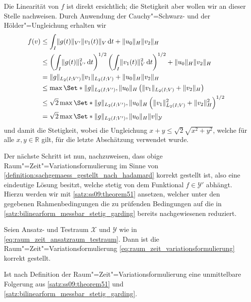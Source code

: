 \documentclass[../main.tex]{subfiles}
\begin{document}
\begin{Bemerkung}
\label{bemerkung:raum_zeit_variationsformulierung_rhs_stetig}
    Die Linearität von $f$ ist direkt ersichtlich; die Stetigkeit aber wollen wir an dieser Stelle nachweisen.
    Durch Anwendung der Cauchy"=Schwarz- und der Hölder"=Ungleichung erhalten wir
    \begin{equation}
        \begin{aligned}
            f(v)
            &\leq \int_{I} \norm{g(t)}_{V'} \norm{v_{1}(t)}_{V} \diff t + \norm{u_{0}}_{H} \norm{v_{2}}_{H}
            \\&\leq \left( \int_{I} \norm{g(t)}^{2}_{V'} \diff t \right)^{1/2} \left( \int_{I} \norm{v_{1}(t)}^{2}_{V} \diff t \right)^{1/2} + \norm{u_{0}}_{H} \norm{v_{2}}_{H}
            \\&= \norm{g}_{L_{2}(I; V')} \norm{v_{1}}_{L_{2}(I; V)} + \norm{u_{0}}_{H} \norm{v_{2}}_{H}
            \\&\leq \max\Set*{\norm{g}_{L_{2}(I; V')}, \norm{u_{0}}_{H}} \left( \norm{v_{1}}_{L_{2}(I; V)} + \norm{v_{2}}_{H} \right)
            \\&\leq \sqrt{2} \max\Set*{\norm{g}_{L_{2}(I; V')}, \norm{u_{0}}_{H}} \left( \norm{v_{1}}_{L_{2}(I; V)}^{2} + \norm{v_{2}}_{H}^{2} \right)^{1/2}
            \\&= \sqrt{2} \max\Set*{\norm{g}_{L_{2}(I; V')}, \norm{u_{0}}_{H}} \norm{v}_{\mathcal Y}
        \end{aligned}
    \end{equation}
    und damit die Stetigkeit, wobei die Ungleichung $x + y \leq \sqrt{2} \sqrt{x^2 + y^2}$, welche für alle $x, y \in \mathbb{R}$ gilt, für die letzte Abschätzung verwendet wurde.
\end{Bemerkung}

Der nächste Schritt ist nun, nachzuweisen, dass obige Raum"=Zeit"=Variationsformulierung im Sinne von \cref{definition:sachgemaess_gestellt_nach_hadamard} korrekt gestellt ist, also eine eindeutige Lösung besitzt, welche stetig von dem Funktional $f \in \mathcal Y'$ abhängt.
Hierzu werden wir mit \cref{satz:ss09:theorem51} ansetzen, welcher unter den gegebenen Rahmenbedingungen die zu prüfenden Bedingungen auf die in \cref{satz:bilinearform_messbar_stetig_garding} bereits nachgewiesenen reduziert.

\begin{Korollar}
\label{satz:raum_zeit_variationsformulierung_sachgemaess_gestellt}
    Seien Ansatz- und Testraum $\mathcal X$ und $\mathcal Y$ wie in \cref{eq:raum_zeit_ansatzraum_testraum}.
    Dann ist die Raum"=Zeit"=Variationsformulierung \cref{eq:raum_zeit_variationsformulierung} korrekt gestellt.

    \begin{Beweis}
        Ist nach Definition der Raum"=Zeit"=Variationsformulierung eine unmittelbare Folgerung aus \cref{satz:ss09:theorem51} und \cref{satz:bilinearform_messbar_stetig_garding}.
    \end{Beweis}
\end{Korollar}
\end{document}
